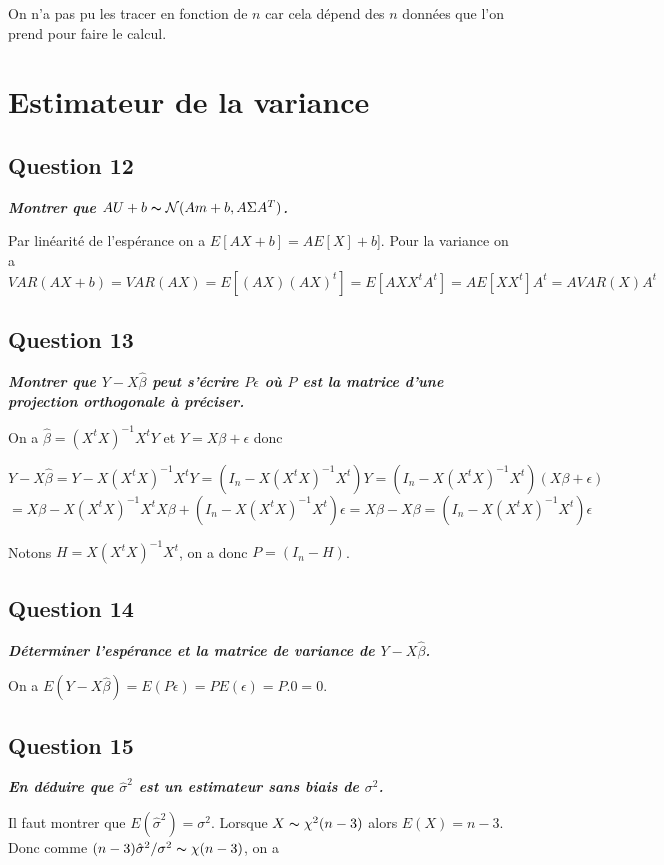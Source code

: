 \documentclass[pdflatex]{article}
\theoremstyle{definition}
\newcommand{\quest}[1]{\textbf{\textit{#1}} \vspace{3mm}}
\begin{document}
\vspace{5mm}
On n'a pas pu les tracer en fonction de $n$ car cela d\'epend des $n$ donn\'ees que l'on prend pour faire le calcul. 

\section*{Estimateur de la variance}
\subsection*{Question 12}
\quest{Montrer que $AU + b \thicksim \mathcal{N}(Am + b, A\Sigma A^T)$.}

Par lin\'earit\'e de l'esp\'erance on a $E[AX+b] = AE[X] + b$]. Pour la variance on a 
$$
VAR(AX+b) = VAR(AX) = E[(AX)(AX)^t] = E[AXX^tA^t] = AE[XX^t]A^t = AVAR(X)A^t
$$

\subsection*{Question 13}
\quest{Montrer que $Y - X\hat{\beta}$ peut s'\'ecrire $P\epsilon$ o\`u $P$ est la matrice d'une projection orthogonale \`a pr\'eciser.}

On a $\hat{\beta} = (X^tX)^{-1}X^tY$ et $Y = X\beta + \epsilon$ donc

$$Y - X\hat{\beta} = Y - X(X^tX)^{-1}X^tY = (I_n - X(X^tX)^{-1}X^t)Y = (I_n - X(X^tX)^{-1}X^t)(X\beta +\epsilon) 
$$
$$
= X\beta - X(X^tX)^{-1}X^tX\beta + (I_n-X(X^tX)^{-1}X^t)\epsilon = X\beta - X\beta = (I_n - X(X^tX)^{-1}X^t)\epsilon
$$

Notons $H = X(X^tX)^{-1}X^t$, on a donc $P = (I_n - H)$.

\subsection*{Question 14}
\quest{D\'eterminer l'esp\'erance et la matrice de variance de $Y - X\hat{\beta}$.}

On a $E(Y-X\hat{\beta}) = E(P\epsilon) = PE(\epsilon) = P.0 = 0$.


\subsection*{Question 15}
\quest{En d\'eduire que $\hat{\sigma}^2$ est un estimateur sans biais de $\sigma^2$.}

Il faut montrer que $E(\hat{\sigma}^2)=\sigma^2$. Lorsque $X \thicksim \chi^2(n-3)$ alors $E(X) = n-3$. Donc comme $(n-3)\hat{\sigma}^2/\sigma^2 \thicksim \chi (n-3)$, on a 
\end{document}

